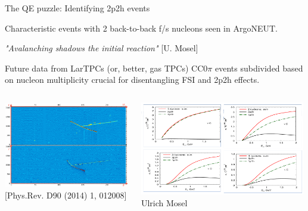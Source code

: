 %
%
%
\begin{frame}{The QE puzzle: Identifying 2p2h events}

\begin{itemize}
{\small
  \item Characteristic events with 2 back-to-back f/s nucleons seen in ArgoNEUT.
  \item {\it "Avalanching shadows the initial reaction"} [U. Mosel]
  \item Future data from LarTPCs (or, better, gas TPCs)
        CC0$\pi$ events subdivided based on nucleon multiplicity crucial for
        disentangling FSI and 2p2h effects.
}
\end{itemize}

  \begin{columns}
    \begin{column}{0.40\textwidth}
      \begin{center}
        \includegraphics[width=0.99\textwidth]{./images/nuint/evdisplay/hammer_event}\\
        {\scriptsize [Phys.Rev. D90 (2014) 1, 012008]}
      \end{center}
    \end{column}
    \begin{column}{0.60\textwidth}
      \begin{center}
        \includegraphics[width=0.99\textwidth]{./images/nuint/ccqe/npnh_gibbu}\\
        {\scriptsize Ulrich Mosel}
      \end{center}
    \end{column}
  \end{columns}


\end{frame}
